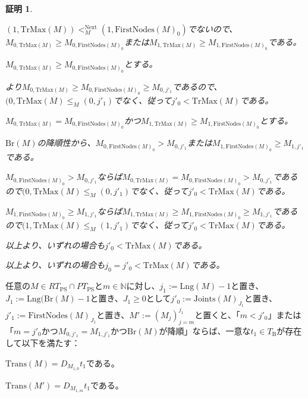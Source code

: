 \documentclass[dvipdfmx,uplatex]{jsarticle}
\theoremstyle{customnonumberbreakfortheorem}
\theoremstyle{customnonumberbreakforproof}
\newtheorem{hideableproof}{証明}
\begin{document}
\begin{hideableproof}
\begin{indented}
\begin{indented}
			\item \((1,\textrm{TrMax}(M)) <_M^{\textrm{Next}} (1,\textrm{FirstNodes}(M)_0)\)でないので、\(M_{0,\textrm{TrMax}(M)} \geq M_{0,\textrm{FirstNodes}(M)_0}\)または\(M_{1,\textrm{TrMax}(M)} \geq M_{1,\textrm{FirstNodes}(M)_0}\)である。
			\item \(M_{0,\textrm{TrMax}(M)} \geq M_{0,\textrm{FirstNodes}(M)_0}\)とする。
			\begin{indented}
				\item {}より\(M_{0,\textrm{TrMax}(M)} \geq M_{0,\textrm{FirstNodes}(M)_0} \geq M_{0,j'_1}\)であるので、\((0,\textrm{TrMax}(M) \leq_M (0,j'_1)\)でなく、従って\(j'_0 < \textrm{TrMax}(M)\)である。
			\end{indented}
			\item \(M_{0,\textrm{TrMax}(M)} = M_{0,\textrm{FirstNodes}(M)_0}\)かつ\(M_{1,\textrm{TrMax}(M)} \geq M_{1,\textrm{FirstNodes}(M)_0}\)とする。
			\begin{indented}
				\item \(\textrm{Br}(M)\)の降順性から、\(M_{0,\textrm{FirstNodes}(M)_0} > M_{0,j'_1}\)または\(M_{1,\textrm{FirstNodes}(M)_0} \geq M_{1,j'_1}\)である。
				\item \(M_{0,\textrm{FirstNodes}(M)_0} > M_{0,j'_1}\)ならば\(M_{0,\textrm{TrMax}(M)} = M_{0,\textrm{FirstNodes}(M)_0} > M_{0,j'_1}\)であるので\((0,\textrm{TrMax}(M) \leq_M (0,j'_1)\)でなく、従って\(j'_0 < \textrm{TrMax}(M)\)である。
				\item \(M_{1,\textrm{FirstNodes}(M)_0} \geq M_{1,j'_1}\)ならば\(M_{1,\textrm{TrMax}(M)} \geq M_{1,\textrm{FirstNodes}(M)_0} \geq M_{1,j'_1}\)であるので\((1,\textrm{TrMax}(M) \leq_M (1,j'_1)\)でなく、従って\(j'_0 < \textrm{TrMax}(M)\)である。
				\item 以上より、いずれの場合も\(j'_0 < \textrm{TrMax}(M)\)である。
			\end{indented}
			\item 以上より、いずれの場合も\(j_0 = j'_0 < \textrm{TrMax}(M)\)である。
		\end{indented}
	\end{indented}
\end{hideableproof}

\begin{lemma}\label{条件(V)の下での終切片とTransの関係}
	任意の\(M \in RT_{\textrm{PS}} \cap PT_{\textrm{PS}}\)と\(m \in \mathbb{N}\)に対し、\(j_1 := \textrm{Lng}(M)-1\)と置き、\(J_1 := \textrm{Lng}(\textrm{Br}(M)-1\)と置き、\(J_1 \geq 0\)として\(j'_0 := \textrm{Joints}(M)_{J_1}\)と置き、\(j'_1 := \textrm{FirstNodes}(M)_{J_1}\)と置き、\(M' := (M_j)_{j=m}^{j_1}\)と置くと、「\(m < j'_0\)」または「\(m = j'_0\)かつ\(M_{0,j'_1} = M_{1,j'_1}\)かつ\(\textrm{Br}(M)\)が降順」ならば、一意な\(t_1 \in T_{\textrm{B}}\)が存在して以下を満たす：
	\begin{penumerate}
		\item \(\textrm{Trans}(M) = D_{M_{1,0}} t_1\)である。
		\item \(\textrm{Trans}(M') = D_{M_{1,m}} t_1\)である。
	\end{penumerate}
\end{lemma}
\end{document}
